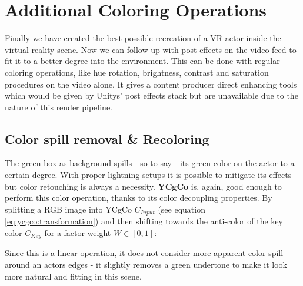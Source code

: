 %
\section{Additional Coloring Operations}

Finally we have created the best possible recreation of a VR actor inside the 
virtual reality scene. Now we can follow up with post effects on the video feed 
to fit it to a better degree into the environment. This can be done with 
regular coloring operations, like hue rotation, brightness, contrast and 
saturation procedures on the video alone. It gives a content producer direct 
enhancing tools which would be given by Unitys' post effects stack but are 
unavailable due to the nature of this render pipeline.

\subsection{Color spill removal \& Recoloring}

The green box as background spills - so to say - its green color on the actor 
to a certain degree. With proper lightning setups it is possible to mitigate 
its effects but color retouching is always a necessity. \textbf{YCgCo} is, 
again, good enough to perform this color operation, thanks to its color 
decoupling properties. By splitting a RGB image into YCgCo $C_{Input}$ (see 
equation \eqref{eq:ycgco:transformation}) and then shifting towards the 
anti-color of the key color $C_{Key}$ for a factor weight $W \in [0, 1]$:




Since this is a linear operation, it does not consider more apparent color 
spill around an actors edges - it slightly removes a green undertone to make it 
look more natural and fitting in this scene.

